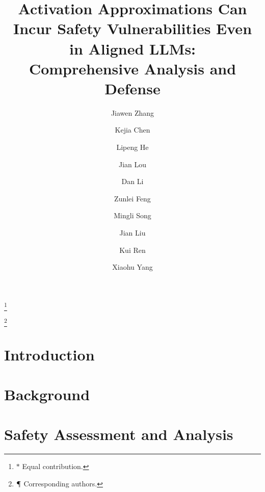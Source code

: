 \documentclass[letterpaper,twocolumn,10pt]{article}
\newcommand\blfootnote[1]{
  \begingroup
  \renewcommand\thefootnote{}\footnote{#1}\vspace{-2em}
  \addtocounter{footnote}{-1}
  \endgroup
}
\newcommand{\inputsection}[1]{%
   \def\sectionfolder{sections/}%
}
\begin{document}
\date{}
\title{\Large \bf Activation Approximations Can Incur Safety Vulnerabilities Even in Aligned LLMs: \\ Comprehensive Analysis and Defense}


\author[$\mathsection \ast$]{Jiawen Zhang}
\author[$\mathsection \ast$]{Kejia Chen}
\author[$\dagger \ast$]{Lipeng He}
\author[$\ddagger \mathparagraph$]{Jian Lou}
\author[$\ddagger$]{Dan Li}
\author[$\mathsection$]{Zunlei Feng}
\author[$\mathsection$]{Mingli Song}
\author[$\mathsection \mathparagraph$]{Jian Liu}
\author[$\mathsection$]{Kui Ren}
\author[$\mathsection$]{Xiaohu Yang}




\maketitle
\blfootnote{$\ast$ Equal contribution.}
\blfootnote{$\mathparagraph$ Corresponding authors.}


\begin{abstract}
\inputsection{abstract}
\end{abstract}



\section{Introduction}
\inputsection{section_1} 

\section{Background}
\inputsection{section_2_new}

\section{Safety Assessment and Analysis}
\label{sec:attack}
\inputsection{section_3}
\end{document}
